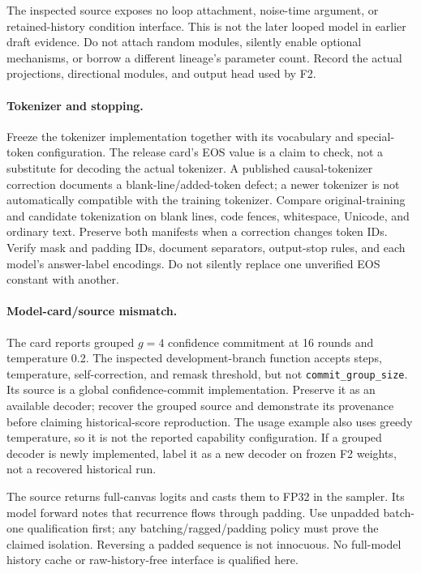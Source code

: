 \documentclass{article}
\theoremstyle{remark}\newtheorem{remark}[theorem]{Remark}
\begin{document}
The inspected source exposes no loop attachment, noise-time argument, or retained-history condition interface. This is not the later looped model in earlier draft evidence. Do not attach random modules, silently enable optional mechanisms, or borrow a different lineage's parameter count. Record the actual projections, directional modules, and output head used by F2.

\paragraph{Tokenizer and stopping.}
Freeze the tokenizer implementation together with its vocabulary and special-token configuration. The release card's EOS value is a claim to check, not a substitute for decoding the actual tokenizer. A published causal-tokenizer correction documents a blank-line/added-token defect; a newer tokenizer is not automatically compatible with the training tokenizer. Compare original-training and candidate tokenization on blank lines, code fences, whitespace, Unicode, and ordinary text. Preserve both manifests when a correction changes token IDs. Verify mask and padding IDs, document separators, output-stop rules, and each model's answer-label encodings. Do not silently replace one unverified EOS constant with another.

\paragraph{Model-card/source mismatch.}
The card reports grouped $g=4$ confidence commitment at 16 rounds and temperature 0.2. The inspected development-branch function accepts steps, temperature, self-correction, and remask threshold, but not \texttt{commit\_group\_size}. Its source is a global confidence-commit implementation. Preserve it as an available decoder; recover the grouped source and demonstrate its provenance before claiming historical-score reproduction. The usage example also uses greedy temperature, so it is not the reported capability configuration. If a grouped decoder is newly implemented, label it as a new decoder on frozen F2 weights, not a recovered historical run.

The source returns full-canvas logits and casts them to FP32 in the sampler. Its model forward notes that recurrence flows through padding. Use unpadded batch-one qualification first; any batching/ragged/padding policy must prove the claimed isolation. Reversing a padded sequence is not innocuous. No full-model history cache or raw-history-free interface is qualified here.
\end{document}
